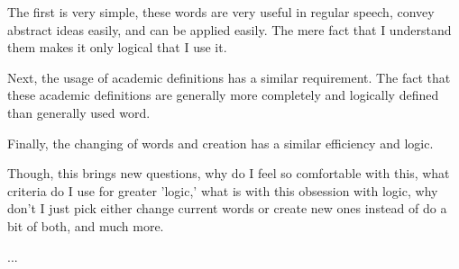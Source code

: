 \par The first is very simple, these words are very useful in regular speech, convey abstract ideas easily, and can be applied easily. The mere fact that I understand them makes it only logical that I use it.
\par Next, the usage of academic definitions has a similar requirement. The fact that these academic definitions are generally more completely and logically defined than generally used word. 
\par Finally, the changing of words and creation has a similar efficiency and logic.
\par Though, this brings new questions, why do I feel so comfortable with this, what criteria do I use for greater 'logic,' what is with this obsession with logic, why don't I just pick either change current words or create new ones instead of do a bit of both, and much more.
\par ...

